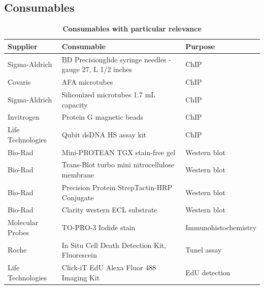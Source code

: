 \documentclass[11pt,twoside,a4paper]{report}
\begin{document}
	    \subsection{Consumables}
	    \label{subsection:consumables}
			\begin{table}[H]
       			\caption{\bf{Consumables with particular relevance}}
        		\begin{center}
            		\begin{tabular}{p{2.9cm} | p{8.2cm} | p{2.2cm}}
	                	\textbf{Supplier} & \textbf{Consumable} &  \textbf{Purpose}\\
    		            \hline
    		            Sigma-Aldrich & BD Precisionglide syringe needles - gauge 27, L 1/2 inches & ChIP\\
						Covaris & AFA microtubes & ChIP\\
						Sigma-Aldrich & Siliconized microtubes 1.7 mL capacity & ChIP\\
        		        Invitrogen & Protein G magnetic beads & ChIP\\
        		        Life Technologies & Qubit dsDNA HS assay kit & ChIP\\
        		        Bio-Rad & Mini-PROTEAN TGX stain-free gel & Western blot\\
        		        Bio-Rad & Trans-Blot turbo mini nitrocellulose membrane & Western blot\\
						Bio-Rad & Precision Protein StrepTactin-HRP Conjugate & Western blot\\
        		        Bio-Rad & Clarity western ECL substrate & Western blot\\
        		        Molecular Probes & TO-PRO-3 Iodide stain & Immunohistochemistry\\
        		        Roche & In Situ Cell Death Detection Kit, Fluorescein & Tunel assay\\
        		        Life Technologies & Click-iT EdU Alexa Fluor 488 Imaging Kit & EdU detection\\        		        
	            	\end{tabular}
    		    \end{center}
		    \end{table}
    
\end{document}
